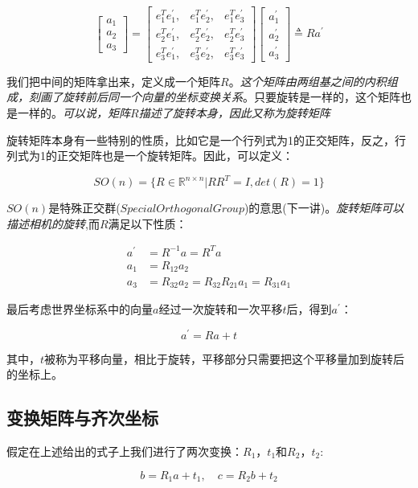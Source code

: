 $$
\begin{bmatrix}
    a_1 \\ a_2 \\ a_3
\end{bmatrix} = 
\begin{bmatrix}
    e_1^Te_1^{'}, & e_1^Te_2^{'}, & e_1^Te_3^{'} \\
    e_2^Te_1^{'}, & e_2^Te_2^{'}, & e_2^Te_3^{'} \\
    e_3^Te_1^{'}, & e_3^Te_2^{'}, & e_3^Te_3^{'} 
\end{bmatrix}
\begin{bmatrix}
    a_1^{'} \\ a_2^{'} \\ a_3^{'}
\end{bmatrix} \triangleq Ra^{'}
$$

    我们把中间的矩阵拿出来，定义成一个矩阵$R$。\emph{这个矩阵由两组基之间的内积组成，刻画了旋转前后同一个向量的坐标变换关系}。只要旋转是一样的，这个矩阵也是一样的。\emph{可以说，矩阵$R$描述了旋转本身，因此又称为旋转矩阵}

    旋转矩阵本身有一些特别的性质，比如它是一个行列式为1的正交矩阵，反之，行列式为1的正交矩阵也是一个旋转矩阵。因此，可以定义：

$$
	SO(n) = \{R \in \mathbb{R}^{n \times n} | RR^T = I, det(R) = 1 \}
$$

    $SO(n)$是特殊正交群($Special Orthogonal Group$)的意思(下一讲)。\emph{旋转矩阵可以描述相机的旋转},而$R$满足以下性质：


$$
\begin{aligned}
	a^{'} &= R^{-1}a = R^Ta \\
	a_1 &= R_{12}a_2 \\
	a_3 &= R_{32}a_2 = R_{32}R_{21}a_1 = R_{31}a_1
\end{aligned}
$$

    最后考虑世界坐标系中的向量$a$经过一次旋转和一次平移$t$后，得到$a^{'}$：

$$
    a^{'} = Ra + t
$$

    其中，$t$被称为平移向量，相比于旋转，平移部分只需要把这个平移量加到旋转后的坐标上。

\subsection{变换矩阵与齐次坐标}

    假定在上述给出的式子上我们进行了两次变换：$R_1，t_1$和$R_2，t_2$:

$$
    b = R_1a + t_1 ,\quad c = R_2b + t_2
$$

